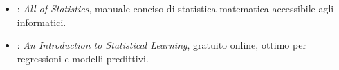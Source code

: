 \begin{biblioparvabox}
\begin{itemize}
\item \cite{wasserman2004}: \emph{All of Statistics},
  manuale conciso di statistica matematica accessibile
  agli informatici.
\item \cite{james2013}: \emph{An Introduction to
  Statistical Learning}, gratuito online, ottimo per
  regressioni e modelli predittivi.
\end{itemize}
\end{biblioparvabox}
